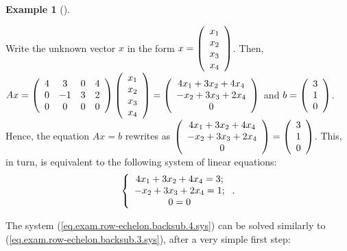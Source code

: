\documentclass[numbers=enddot,12pt,final,onecolumn,notitlepage]{scrartcl}%
\theoremstyle{definition}
\newtheorem{exam}[theo]{Example}
\newenvironment{example}[1][]
{\begin{exam}[#1]\begin{leftbar}}
{\end{leftbar}\end{exam}}
\begin{document}
\begin{example}
Write the unknown vector $x$ in the form $x=\left(
\begin{array}
[c]{c}%
x_{1}\\
x_{2}\\
x_{3}\\
x_{4}%
\end{array}
\right)  $. Then, $Ax=\left(
\begin{array}
[c]{cccc}%
4 & 3 & 0 & 4\\
0 & -1 & 3 & 2\\
0 & 0 & 0 & 0
\end{array}
\right)  \left(
\begin{array}
[c]{c}%
x_{1}\\
x_{2}\\
x_{3}\\
x_{4}%
\end{array}
\right)  =\left(
\begin{array}
[c]{c}%
4x_{1}+3x_{2}+4x_{4}\\
-x_{2}+3x_{3}+2x_{4}\\
0
\end{array}
\right)  $ and $b=\left(
\begin{array}
[c]{c}%
3\\
1\\
0
\end{array}
\right)  $. Hence, the equation $Ax=b$ rewrites as $\left(
\begin{array}
[c]{c}%
4x_{1}+3x_{2}+4x_{4}\\
-x_{2}+3x_{3}+2x_{4}\\
0
\end{array}
\right)  =\left(
\begin{array}
[c]{c}%
3\\
1\\
0
\end{array}
\right)  $. This, in turn, is equivalent to the following system of linear
equations:%
\begin{equation}
\left\{
\begin{array}
[c]{c}%
4x_{1}+3x_{2}+4x_{4}=3;\\
-x_{2}+3x_{3}+2x_{4}=1;\\
0=0
\end{array}
\right.  . \label{eq.exam.row-echelon.backsub.4.sys}%
\end{equation}


The system (\ref{eq.exam.row-echelon.backsub.4.sys}) can be solved similarly
to (\ref{eq.exam.row-echelon.backsub.3.sys}), after a very simple first step:


\end{example}
\end{document}
